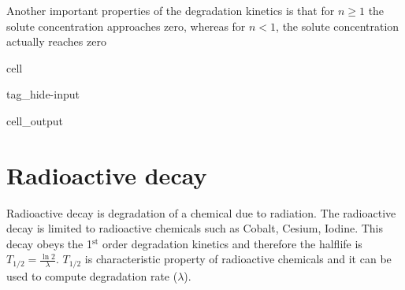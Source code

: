 \documentclass[letterpaper,10pt,english]{jupyterBook}
\begin{document}
\sphinxAtStartPar
Another important properties of the degradation kinetics is that for \(n\geq 1\) the solute concentration  approaches zero, whereas for \(n<1\), the solute concentration actually reaches zero

\begin{sphinxuseclass}{cell}
\begin{sphinxuseclass}{tag_hide-input}\begin{sphinxVerbatimOutput}

\begin{sphinxuseclass}{cell_output}
\noindent{}

\end{sphinxuseclass}\end{sphinxVerbatimOutput}

\end{sphinxuseclass}
\end{sphinxuseclass}

\section{Radioactive decay}
\label{\detokenize{content/transport/L10/22_reactive_transport:radioactive-decay}}
\sphinxAtStartPar
Radioactive decay is degradation of a chemical due to radiation. The radioactive decay is limited to radioactive chemicals such as Cobalt, Cesium, Iodine. This decay obeys the 1\(^\text{st}\)\sphinxhyphen{} order degradation kinetics and therefore the half\sphinxhyphen{}life is \(T_{1/2} = \frac{\ln 2}{\lambda}\). \(T_{1/2}\) is characteristic property of radioactive chemicals and it can be used to compute degradation rate (\(\lambda\)).
\end{document}

